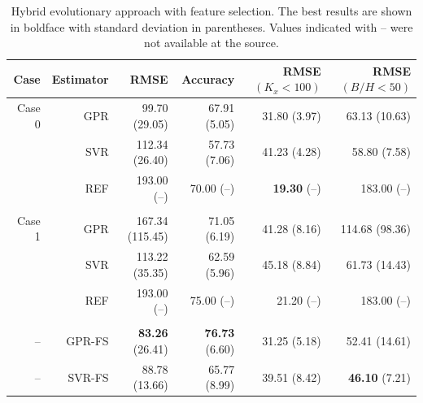 \documentclass[a4paper,12pt, english]{article}
\begin{document}
% 
\begin{table}[!]
\centering
\caption{\label{tab:results_fs}  
Hybrid evolutionary approach with feature selection.
The best results are shown in boldface with standard deviation in parentheses. Values indicated with  -- were not available at the source.
}
\begin{tabular}{rrrrrr}
\hline
Case      & Estimator &                 RMSE &           Accuracy   &    RMSE$(K_x<100)$ &       RMSE$(B/H<50)$    \\\hline                                                               
   Case 0 &       GPR &         99.70  (29.05) &         67.91 (5.05)&       31.80 (3.97) &          63.13 (10.63) \\
          &       SVR &         112.34 (26.40) &         57.73 (7.06)&       41.23 (4.28) &         58.80 (7.58)   \\
          &       REF &            193.00 (--) &    {     70.00} (--)&  { \bf 19.30} (--) &            183.00 (--) \\\\
   Case 1 &       GPR &        167.34 (115.45) &         71.05 (6.19)&       41.28 (8.16) &         114.68 (98.36) \\
          &       SVR &        113.22  (35.35) &         62.59 (5.96)&       45.18 (8.84) &          61.73 (14.43) \\
          &       REF &            193.00 (--) &     {    75.00} (--)&  {     21.20} (--) &            183.00 (--) \\\\
   --     &    GPR-FS &   { \bf 83.26} (26.41) & { \bf 76.73} (6.60) &       31.25 (5.18) &        52.41 (14.61)   \\
   --     &    SVR-FS &          88.78 (13.66) &        65.77 (8.99) &       39.51 (8.42) &    { \bf 46.10} (7.21) \\
\hline 
\end{tabular} 
\end{table}
\end{document}
